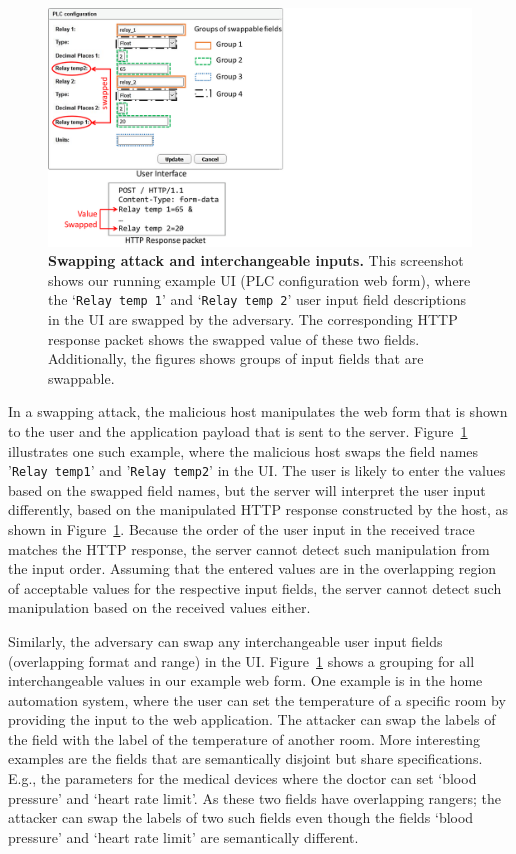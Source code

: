 \begin{figure}[t]
  \centering

     \includegraphics[trim={0 -1cm 14cm 0},clip, width=0.7\linewidth]{chapters/IntegriKey/images/SwapExample.pdf}
    \caption[Swapping attack and interchangeable inputs]{\textbf{Swapping attack and interchangeable inputs.} This screenshot shows our running example UI (PLC configuration web form), where the `\texttt{Relay temp 1}' and `\texttt{Relay temp 2}' user input field descriptions in the UI are swapped by the adversary. The corresponding HTTP response packet shows the swapped value of these two fields. Additionally, the figures shows groups of input fields that are swappable.} 
    \label{fig:swapExample} 
\end{figure}


In a swapping attack, the malicious host manipulates the web form that is shown to the user and the application payload that is sent to the server. Figure~\ref{fig:swapExample} illustrates one such example, where the malicious host swaps the field names '\texttt{Relay temp1}' and '\texttt{Relay temp2}' in the UI. The user is likely to enter the values based on the swapped field names, but the server will interpret the user input differently, based on the manipulated HTTP response constructed by the host, as shown in Figure~\ref{fig:swapExample}. Because the order of the user input in the received trace matches the HTTP response, the server cannot detect such manipulation from the input order. Assuming that the entered values are in the overlapping region of acceptable values for the respective input fields, the server cannot detect such manipulation based on the received values either. 

Similarly, the adversary can swap any interchangeable user input fields (overlapping format and range) in the UI. Figure~\ref{fig:swapExample} shows a grouping for all interchangeable values in our example web form. One example is in the home automation system, where the user can set the temperature of a specific room by providing the input to the web application. The attacker can swap the labels of the field with the label of the temperature of another room. More interesting examples are the fields that are semantically disjoint but share specifications. E.g., the parameters for the medical devices where the doctor can set `blood pressure' and `heart rate limit'. As these two fields have overlapping rangers; the attacker can swap the labels of two such fields even though the fields `blood pressure' and `heart rate limit' are semantically different. 

